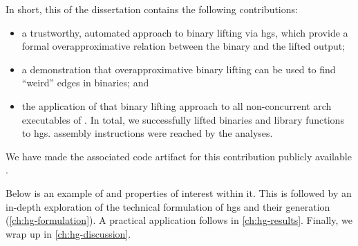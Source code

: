 In short, this  of the dissertation contains the following contributions:
\begin{itemize}
  \item a trustworthy, automated approach to binary lifting via \glspl{hg}, which provide a formal overapproximative relation between the binary and the lifted output;
  \item a demonstration that overapproximative binary lifting can be used to find ``weird'' edges in binaries; and
  \item the application of that binary lifting approach to all non-concurrent \gls{arch} executables of .
  In total, we successfully lifted  binaries and  library functions to \glspl{hg}.
  assembly instructions were reached by the analyses.
\end{itemize}
\begin{comment}
  The work was developed in collaboration with Dr.~Freek Verbeek, with the case study application being primarily done by me.
\end{comment}
We have made the associated code artifact for this contribution publicly available \autocite{bockenek2022artifact}.

Below is an example of  and properties of interest within it.
This  is followed by an in-depth exploration of the technical formulation of \glspl{hg} and their generation (\cref{ch:hg-formulation}).
A practical application follows in \cref{ch:hg-results}.
Finally, we wrap up in \cref{ch:hg-discussion}.

